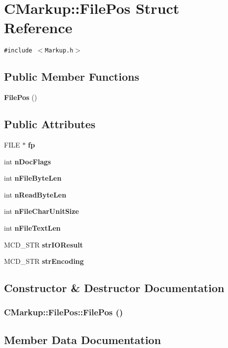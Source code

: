 \section{CMarkup::FilePos Struct Reference}
\label{structCMarkup_1_1FilePos}
{\tt \#include $<$Markup.h$>$}

\subsection*{Public Member Functions}
\begin{CompactItemize}
\item 
{\bf FilePos} ()
\end{CompactItemize}
\subsection*{Public Attributes}
\begin{CompactItemize}
\item 
FILE $\ast$ {\bf fp}
\item 
int {\bf nDocFlags}
\item 
int {\bf nFileByteLen}
\item 
int {\bf nReadByteLen}
\item 
int {\bf nFileCharUnitSize}
\item 
int {\bf nFileTextLen}
\item 
MCD\_\-STR {\bf strIOResult}
\item 
MCD\_\-STR {\bf strEncoding}
\end{CompactItemize}


\subsection{Constructor \& Destructor Documentation}
\subsubsection[FilePos]{\setlength{\rightskip}{0pt plus 5cm}CMarkup::FilePos::FilePos ()\hspace{0.3cm}{\tt  [inline]}}\label{structCMarkup_1_1FilePos_88d083c8aee934fd42de2950a31d3682}




\subsection{Member Data Documentation}
